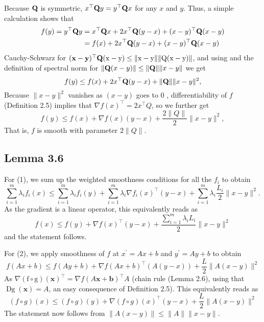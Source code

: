 Because $\boldsymbol{\mathbf{Q}} $ is symmetric, $x^{\top} \boldsymbol{\mathbf{Q}}  y=y^{\top} \boldsymbol{\mathbf{Q}}  x$ for any $x$ and $y$. Thus, a simple calculation shows that
$$
\begin{aligned}
f(y)=y^{\top} \boldsymbol{\mathbf{Q}}  y &=x^{\top} \boldsymbol{\mathbf{Q}}  x+2 x^{\top} \boldsymbol{\mathbf{Q}} (y-x)+(x-y)^{\top} \boldsymbol{\mathbf{Q}} (x-y) \\
&=f(x)+2 x^{\top} \boldsymbol{\mathbf{Q}} (y-x)+(x-y)^{\top} \boldsymbol{\mathbf{Q}} (x-y)
\end{aligned}
$$
Cauchy-Schwarz for $(\mathbf{x}-\mathbf{y})^{\top} \boldsymbol{\mathbf{Q}} (\mathrm{x}-\mathrm{y}) \leq\|\mathrm{x}-\mathrm{y}\|\|\mathrm{Q}(\mathrm{x}-\mathrm{y})\|$, and using and the definition of spectral norm for $\|\boldsymbol{\mathbf{Q}} (x-y)\| \leq\|\boldsymbol{\mathbf{Q}} \|\|x-y\|$ we get
$$
f(y) \leq f(x)+2 x^{\top} \boldsymbol{\mathbf{Q}} (y-x)+\|\boldsymbol{\mathbf{Q}} \|\|x-y\|^{2},
$$
Because $\|x-y\|^{2}$ vanishes as $(x-y)$ goes to 0 , differentiability of $f$ (Definition 2.5) implies that $\nabla f(x)^{\top}=2 x^{\top} Q$, so we further get
$$
f(y) \leq f(x)+\nabla f(x)(y-x)+\frac{2\|Q\|}{2}\|x-y\|^{2},
$$
That is, $f$ is smooth with parameter $2\|Q\|$.

\subsection*{Lemma 3.6}
For (1), we sum up the weighted smoothness conditions for all the $f_{i}$ to obtain
$$
\sum_{i=1}^{m} \lambda_{i} f_{i}(x) \leq \sum_{i=1}^{m} \lambda_{i} f_{i}(y)+\sum_{i=1}^{m} \lambda_{i} \nabla f_{i}(x)^{\top}(y-x)+\sum_{i=1}^{m} \lambda_{i} \frac{L_{i}}{2}\|x-y\|^{2} .
$$
As the gradient is a linear operator, this equivalently reads as
$$
f(x) \leq f(y)+\nabla f(x)^{\top}(y-x)+\frac{\sum_{i=1}^{m} \lambda_{i} L_{i}}{2}\|x-y\|^{2}
$$
and the statement follows.

For (2), we apply smoothness of $f$ at $x^{\prime}=A x+b$ and $y^{\prime}=A y+b$ to obtain
$$
f(A x+b) \leq f(A y+b)+\nabla f(A x+b)^{\top}(A(y-x))+\frac{L}{2}\|A(x-y)\|^{2}
$$
As $\nabla(\mathrm{f} \circ \mathrm{g})(\mathbf{x})^{\top}=\nabla f(A \mathbf{x}+\mathbf{b})^{\top} A$ (chain rule (Lemma 2.6), using that $\operatorname{Dg}(\mathbf{x})=A$, an easy consequence of Definition 2.5). This equivalently reads as
$$
(f \circ g)(x) \leq(f \circ g)(y)+\nabla(f \circ g)(x)^{\top}(y-x)+\frac{L}{2}\|A(x-y)\|^{2}
$$
The statement now follows from $\|A(x-y)\| \leq\|A\|\|x-y\|$.

